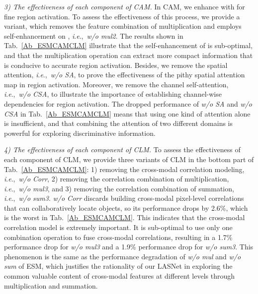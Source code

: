 \documentclass[journal]{IEEEtran}
\newcommand{\ie}{\textit{i}.\textit{e}.,~}
\begin{document}
\textit{3) The effectiveness of each component of CAM.}
In CAM, we enhance  with  for fine region activation.
To assess the effectiveness of this process, we provide a variant, which removes the feature combination of multiplication and employs self-enhancement on , \ie \textit{w/o mul2}.
The results shown in Tab.~\ref{Ab_ESMCAMCLM} illustrate that the self-enhancement of  is sub-optimal, and that the multiplication operation can extract more compact information that is conducive to accurate region activation.
Besides, we remove the spatial attention, \ie \textit{w/o SA}, to prove the effectiveness of the pithy spatial attention map in region activation.
Moreover, we remove the channel self-attention, \ie \textit{w/o CSA}, to illustrate the importance of establishing channel-wise dependencies for region activation.
The dropped performance of \textit{w/o SA} and \textit{w/o CSA} in Tab.~\ref{Ab_ESMCAMCLM} means that using one kind of attention alone is insufficient, and that combining the attention of two different domains is powerful for exploring discriminative information.


\textit{4) The effectiveness of each component of CLM.}
To assess the effectiveness of each component of CLM, we provide three variants of CLM in the bottom part of Tab.~\ref{Ab_ESMCAMCLM}:
1) removing the cross-modal correlation modeling, \ie \textit{w/o Corr},
2) removing the correlation combination of multiplication, \ie \textit{w/o mul3}, and 
3) removing the correlation combination of summation, \ie \textit{w/o sum3}. 
\textit{w/o Corr} discards building cross-modal pixel-level correlations that can collaboratively locate objects, so its performance drops by 2.6\%, which is the worst in Tab.~\ref{Ab_ESMCAMCLM}.
This indicates that the cross-modal correlation model is extremely important.
It is sub-optimal to use only one combination operation to fuse cross-modal correlations, resulting in a 1.7\% performance drop for \textit{w/o mul3} and a 1.9\% performance drop for \textit{w/o sum3}. 
This phenomenon is the same as the performance degradation of \textit{w/o mul} and \textit{w/o sum} of ESM, which justifies the rationality of our LASNet in exploring the common valuable content of cross-modal features at different levels through multiplication and summation.
\end{document}
